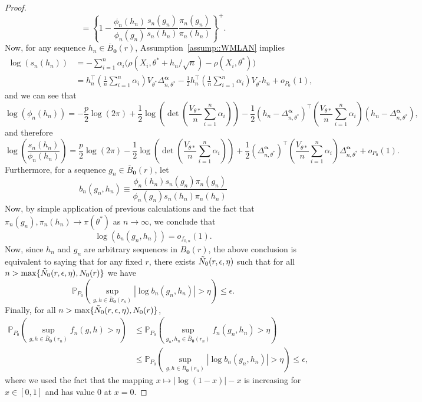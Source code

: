 \documentclass[11pt, oneside]{amsart}
\theoremstyle{definition}   %
\newcommand{\loss}{\rho}
\begin{document}
\begin{proof}
\[    %
    = \left \{ 1 - \frac{\phi_n(h_n)}{\phi_n(g_n)} \frac{s_n(g_n)}{s_n(h_n)}\frac{\pi_n(g_n)}{\pi_n(h_n)} \right \} ^ +.
\]
%
Now, for any sequence $h_n \in \overline{B}_{\textbf{0}}(r)$, Assumption~\ref{assump::WMLAN} implies
%
\[
\begin{split}
    \log (s_n (h_n)) &= -\sum_{i=1}^n \alpha_i \bigl ( \loss (X_i, \theta^* + h_n/\sqrt{n}) - \loss (X_i, \theta^*) \bigr ) \\
    &= 
    h_n^\top \left ( \frac{1}{n} \sum_{i = 1}^n \alpha_i \right ) V_{\theta^*} \Delta^{\boldsymbol{\alpha}}_{n, \theta^*} - \frac{1}{2} h_n^\top \left ( \frac{1}{n} \sum_{i = 1}^n \alpha_i \right ) V_{\theta^*} h_n + o_{P_0}(1),
\end{split}
\]
%
and we can see that
%
\[
    \log (\phi_n (h_n)) =
    - \frac{p}{2} \log (2 \pi) + \frac{1}{2} \log (\det ( \frac{V_{\theta*}}{n} \sum_{i = 1}^n \alpha_i )) - \frac{1}{2} (h_n - \Delta^{\boldsymbol{\alpha}}_{n, \theta^*}) ^ \top \left ( \frac{V_{\theta*}}{n} \sum_{i = 1}^n \alpha_i \right )  (h_n - \Delta^{\boldsymbol{\alpha}}_{n, \theta^*}),
\]
%
and therefore
%
\begin{equation*}
    \log \left ( \frac{s_n(h_n)}{\phi_n(h_n)} \right ) =
    \frac{p}{2} \log (2 \pi) - \frac{1}{2} \log (\det ( \frac{V_{\theta*}}{n} \sum_{i = 1}^n \alpha_i )) + \frac{1}{2} {(\Delta^{\boldsymbol{\alpha}}_{n, \theta^*})}^\top \left ( \frac{V_{\theta*}}{n} \sum_{i = 1}^n \alpha_i \right ) \Delta^{\boldsymbol{\alpha}}_{n, \theta^*} + o_{P_0}(1).
\end{equation*}
%
Furthermore, for a sequence $g_n \in \overline{B}_\mathbf{0}(r)$, let
%
\[
    b_n (g_n, h_n) \equiv \frac{\phi_n (h_n) s_n (g_n) \pi_n (g_n)}{\phi_n (g_n) s_n(h_n) \pi_n (h_n)}
\]
%
Now, by simple application of previous calculations and the fact that $\pi_n(g_n), \pi_n(h_n) \rightarrow \pi (\theta^*)$ as $n \rightarrow \infty$, we conclude that
%
\begin{equation*}
    \log (b_n (g_n, h_n)) = o_{f_{0, n}}(1).
\end{equation*}
%
Now, since $h_n$ and $g_n$ are arbitrary sequences in $B_{\mathbf{0}}(r)$, the above conclusion is equivalent to saying that for any fixed $r$, there exists $\Tilde{N}_0 (r, \epsilon, \eta)$ such that for all $n > \max \{ \Tilde{N}_0 (r, \epsilon, \eta), N_0(r) \}$ we have
%
\[
    \mathbb{P}_{P_0} \left ( \underset{g,h \in \overline{B}_{\textbf{0}}(r_n) }{\sup} | \log b_n(g_n, h_n) | > \eta  \right ) \leq \epsilon.
\]
%
Finally, for all $n > \max \{ \Tilde{N}_0 (r, \epsilon, \eta), N_0(r) \}$,
%
\begin{align*}
    \mathbb{P}_{P_0} \left ( \underset{g,h \in \overline{B}_{\textbf{0}}(r_n) }{\sup} f_n(g, h) > \eta \right) 
    & \leq \mathbb{P}_{P_0} \left ( \underset{g_n,h_n \in \overline{B}_{\textbf{0}}(r_n) }{\sup} f_n(g_n, h_n) > \eta \right) \\
    &\leq \mathbb{P}_{P_0} \left ( \underset{g,h \in \overline{B}_{\textbf{0}}(r_n) }{\sup} | \log b_n(g_n, h_n) | > \eta  \right ) 
    \leq \epsilon,
\end{align*}
%
where we used the fact that the mapping $x \mapsto |\log (1 - x)| - x$ is increasing for $x \in [0,1]$ and has value 0 at $x = 0$.


\end{proof}
\end{document}
